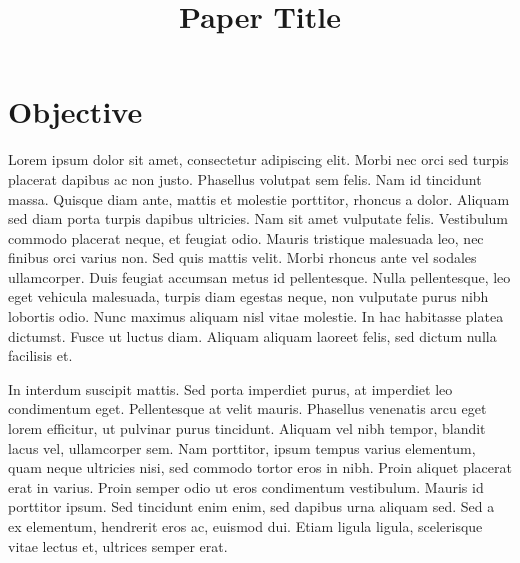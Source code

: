 \documentclass[conference]{IEEEtran}
\begin{document}
\title{Paper Title\\}

\author{
\and
{}
\and
{}
}

\maketitle

\section{Objective}

Lorem ipsum dolor sit amet, consectetur adipiscing elit. Morbi nec orci sed turpis placerat dapibus ac non justo. Phasellus volutpat sem felis. Nam id tincidunt massa. Quisque diam ante, mattis et molestie porttitor, rhoncus a dolor. Aliquam sed diam porta turpis dapibus ultricies. Nam sit amet vulputate felis. Vestibulum commodo placerat neque, et feugiat odio. Mauris tristique malesuada leo, nec finibus orci varius non. Sed quis mattis velit. Morbi rhoncus ante vel sodales ullamcorper. Duis feugiat accumsan metus id pellentesque. Nulla pellentesque, leo eget vehicula malesuada, turpis diam egestas neque, non vulputate purus nibh lobortis odio. Nunc maximus aliquam nisl vitae molestie. In hac habitasse platea dictumst. Fusce ut luctus diam. Aliquam aliquam laoreet felis, sed dictum nulla facilisis et.

In interdum suscipit mattis. Sed porta imperdiet purus, at imperdiet leo condimentum eget. Pellentesque at velit mauris. Phasellus venenatis arcu eget lorem efficitur, ut pulvinar purus tincidunt. Aliquam vel nibh tempor, blandit lacus vel, ullamcorper sem. Nam porttitor, ipsum tempus varius elementum, quam neque ultricies nisi, sed commodo tortor eros in nibh. Proin aliquet placerat erat in varius. Proin semper odio ut eros condimentum vestibulum. Mauris id porttitor ipsum. Sed tincidunt enim enim, sed dapibus urna aliquam sed. Sed a ex elementum, hendrerit eros ac, euismod dui. Etiam ligula ligula, scelerisque vitae lectus et, ultrices semper erat.
\end{document}
